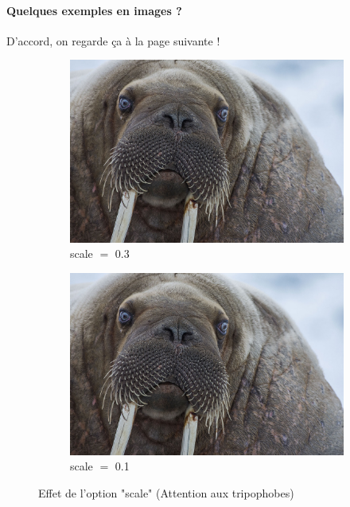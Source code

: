 \documentclass[a4paper, 13pt]{report} %
\begin{document}
		\paragraph{Quelques exemples en images ?\\}
			D'accord, on regarde ça à la page suivante !\newpage
			\begin{figure}[h!]\centering
				\begin{subfigure}{.49\linewidth}\centering
					\includegraphics[scale=.3]{dimensions/phoque.jpg}
					\caption{scale $=$ \num{.3}}
				\end{subfigure}\hfill
				\begin{subfigure}{.49\linewidth}\centering
					\includegraphics[scale=.1]{dimensions/phoque.jpg}
					\caption{scale $=$ \num{.1}}
				\end{subfigure}
				\caption{Effet de l'option "scale" (Attention aux tripophobes)}
			\end{figure}
\end{document}
